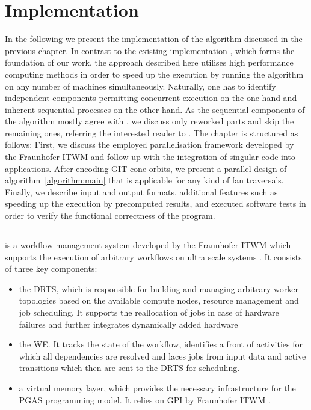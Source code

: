 \chapter{Implementation}

In the following we present the implementation of the algorithm discussed in the previous chapter. In contrast to the existing \singular{} implementation \gitfanlib{} \cite{gitfanlib}, which forms the foundation of our work, the approach described here utilises high performance computing methods in order to speed up the execution by running the algorithm on any number of machines simultaneously. Naturally, one has to identify independent components permitting concurrent execution on the one hand and inherent sequential processes on the other hand. As the sequential components of the algorithm mostly agree with \gitfanlib{}, we discuss only reworked parts and skip the remaining ones, referring the interested reader to \cite{gitfanlib}. The chapter is structured as follows: First, we discuss the employed parallelisation framework \gpispace{} developed by the \ac{Fraunhofer ITWM} and follow up with the integration of singular code into \gpispace{} applications. After encoding GIT cone orbits, we present a parallel design of algorithm~\ref{algorithm:main} that is applicable for any kind of fan traversals. Finally, we describe input and output formats, additional features such as speeding up the execution by precomputed results, and executed software tests in order to verify the functional correctness of the program.

\section{\gpispace}

\gpispace{} is a workflow management system developed by the \ac{Fraunhofer ITWM} which supports the execution of arbitrary workflows on ultra scale systems \cite{gpispace}. It consists of three key components: 
\begin{itemize}
	\item the \ac{DRTS}, which is responsible for building and managing arbitrary worker topologies based on the available compute nodes, resource management and job scheduling. It supports the reallocation of jobs in case of hardware failures and further integrates dynamically added hardware
	\item the \ac{WE}. It tracks the state of the workflow, identifies a front of activities for which all dependencies are resolved and laces jobs from input data and active transitions which then are sent to the \ac{DRTS} for scheduling.
	\item a virtual memory layer, which provides the necessary infrastructure for the \ac{PGAS} programming model. It relies on \textsc{GPI} by \ac{Fraunhofer ITWM} \cite{gpi}.
\end{itemize}

